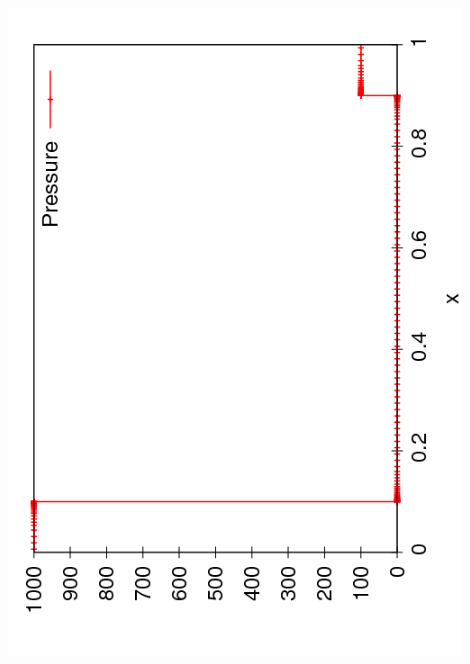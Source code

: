 \documentclass{beamer}
\begin{document}
\begin{frame}
\begin{columns}
\begin{column}{0.5\textwidth}
\begin{overlayarea}{\textwidth}{0.9\textheight}
{          \includegraphics[angle=-90,width=0.9\textwidth]{figures/AMR_Pressure_0}
        }
        {
}
\end{overlayarea}
\end{column}
\end{columns}
\end{frame}
\end{document}
